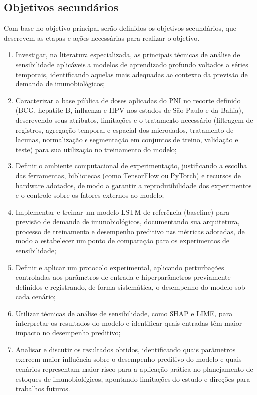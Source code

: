 \documentclass[
    12pt,                %
    openright,           %
    oneside,             %
    a4paper,             %
    english,             %
    brazil               %
]{abntex2}
\begin{document}
\subsection{Objetivos secundários}
\label{sec:objetivos_secundarios}

Com base no objetivo principal serão definidos os objetivos secundários, que descrevem as etapas e ações necessárias para realizar o objetivo.

\begin{enumerate}
    \item Investigar, na literatura especializada, as principais técnicas de análise de sensibilidade aplicáveis a modelos de aprendizado profundo voltados a séries temporais, identificando aquelas mais adequadas ao contexto da previsão de demanda de imunobiológicos;
    \item Caracterizar a base pública de doses aplicadas do PNI no recorte definido (BCG, hepatite B, influenza e HPV nos estados de São Paulo e da Bahia), descrevendo seus atributos, limitações e o tratamento necessário (filtragem de registros, agregação temporal e espacial dos microdados, tratamento de lacunas, normalização e segmentação em conjuntos de treino, validação e teste) para sua utilização no treinamento do modelo;
    \item Definir o ambiente computacional de experimentação, justificando a escolha das ferramentas, bibliotecas (como TensorFlow ou PyTorch) e recursos de hardware adotados, de modo a garantir a reprodutibilidade dos experimentos e o controle sobre os fatores externos ao modelo;
    \item Implementar e treinar um modelo LSTM de referência (baseline) para previsão de demanda de imunobiológicos, documentando sua arquitetura, processo de treinamento e desempenho preditivo nas métricas adotadas, de modo a estabelecer um ponto de comparação para os experimentos de sensibilidade;
    \item Definir e aplicar um protocolo experimental, aplicando perturbações controladas aos parâmetros de entrada e hiperparâmetros previamente definidos e registrando, de forma sistemática, o desempenho do modelo sob cada cenário;
    \item Utilizar técnicas de análise de sensibilidade, como SHAP e LIME, para interpretar os resultados do modelo e identificar quais entradas têm maior impacto no desempenho preditivo;
    \item Analisar e discutir os resultados obtidos, identificando quais parâmetros exercem maior influência sobre o desempenho preditivo do modelo e quais cenários representam maior risco para a aplicação prática no planejamento de estoques de imunobiológicos, apontando limitações do estudo e direções para trabalhos futuros.
\end{enumerate}
\end{document}
